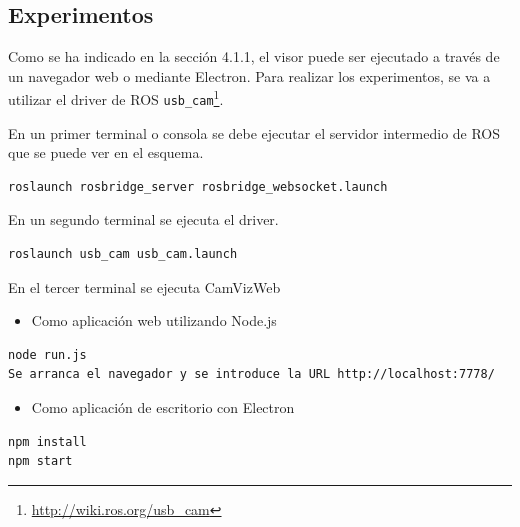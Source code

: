 \subsection{Experimentos}
Como se ha indicado en la sección 4.1.1, el visor puede ser ejecutado a través de un navegador web o mediante Electron. Para realizar los experimentos, se va a utilizar el driver de ROS \texttt{usb\_cam}\footnote{\url{http://wiki.ros.org/usb_cam}}.

En un primer terminal o consola se debe ejecutar el servidor intermedio de ROS que se puede ver en el esquema.
\begin{lstlisting}[caption= Ejecución del servidor intermedio, label=cod.servidorintermediocamviz]
roslaunch rosbridge_server rosbridge_websocket.launch
\end{lstlisting}
En un segundo terminal se ejecuta el driver.

\begin{lstlisting}[caption= Ejecución del driver de ROS label=cod.driverusbcam]
roslaunch usb_cam usb_cam.launch
\end{lstlisting}

En el tercer terminal se ejecuta CamVizWeb

\begin{itemize}
\item 
Como aplicación web utilizando Node.js
\end{itemize}
\begin{lstlisting}[caption= Ejecución con Node.js, label=cod.camviznodejs]
node run.js
Se arranca el navegador y se introduce la URL http://localhost:7778/
\end{lstlisting}
\begin{itemize}
\item 
Como aplicación de escritorio con Electron
\end{itemize}
\begin{lstlisting}[caption= Ejecución con Electron, label=cod.camvizelectron]
npm install
npm start
\end{lstlisting}

